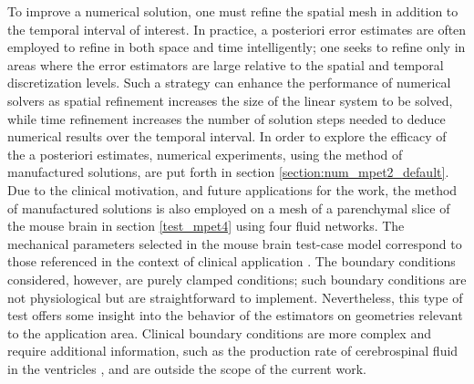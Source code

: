 To improve a numerical solution, one must refine the spatial mesh in addition to the temporal interval of interest. In practice, a posteriori error estimates are often employed to refine in both space and time intelligently; one seeks to refine only in areas where the error estimators are large relative to the spatial and temporal discretization levels. Such a strategy can enhance the performance of numerical solvers as spatial refinement increases the size of the linear system to be solved, while time refinement increases the number of solution steps needed to deduce numerical results over the temporal interval. In order to explore the efficacy of the a posteriori estimates, numerical experiments, using the method of manufactured solutions, are put forth in section \ref{section:num_mpet2_default}. Due to the clinical motivation, and future applications for the work, the method of manufactured solutions is also employed on a mesh of a parenchymal slice of the mouse brain in section \ref{test_mpet4} using four fluid networks.  The mechanical parameters selected in the mouse brain test-case model correspond to those referenced in the context of clinical application \cite{vardakis,lee}. The boundary conditions considered, however, are purely clamped conditions; such boundary conditions are not physiological but are straightforward to implement. Nevertheless, this type of test offers some insight into the behavior of the estimators on geometries relevant to the application area. Clinical boundary conditions are more complex and require additional information, such as the production rate of cerebrospinal fluid in the ventricles \cite{guo,vardakis}, and are outside the scope of the current work.
\\
\\
